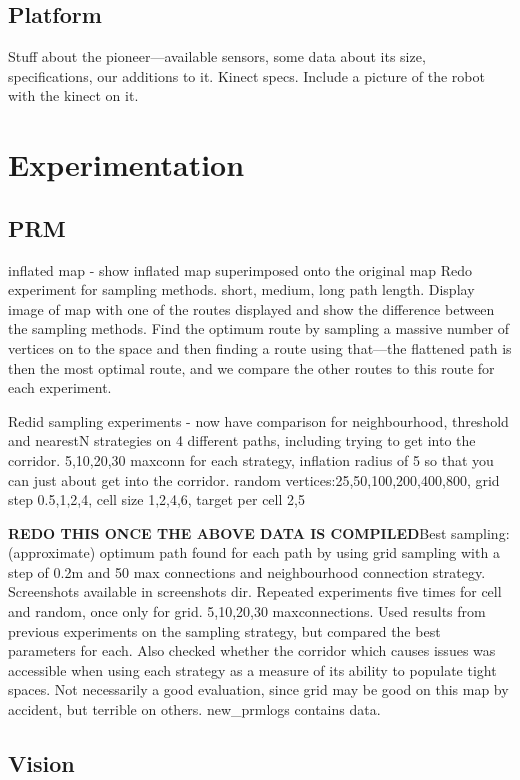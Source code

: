 \documentclass[conference]{IEEEtran}
\begin{document}
\subsection{Platform}
Stuff about the pioneer---available sensors, some data about its size, specifications, our additions to it. Kinect specs. Include a picture of the robot with the kinect on it. 
\section{Experimentation}
\subsection{PRM}
inflated map - show inflated map superimposed onto the original map
Redo experiment for sampling methods. short, medium, long path length. Display image of map with one of the routes displayed and show the difference between the sampling methods. Find the optimum route by sampling a massive number of vertices on to the space and then finding a route using that---the flattened path is then the most optimal route, and we compare the other routes to this route for each experiment.

Redid sampling experiments - now have comparison for neighbourhood, threshold and nearestN strategies on 4 different paths, including trying to get into the corridor. 5,10,20,30 maxconn for each strategy, inflation radius of 5 so that you can just about get into the corridor. random vertices:25,50,100,200,400,800, grid step 0.5,1,2,4, cell size 1,2,4,6, target per cell 2,5

\textbf{REDO THIS ONCE THE ABOVE DATA IS COMPILED}Best sampling: (approximate) optimum path found for each path by using grid sampling with a step of 0.2m and 50 max connections and neighbourhood connection strategy. Screenshots available in screenshots dir. Repeated experiments five times for cell and random, once only for grid. 5,10,20,30 maxconnections. Used results from previous experiments on the sampling strategy, but compared the best parameters for each. Also checked whether the corridor which causes issues was accessible when using each strategy as a measure of its ability to populate tight spaces. Not necessarily a good evaluation, since grid may be good on this map by accident, but terrible on others. new\_prmlogs contains data.


\subsection{Vision}
\end{document}
